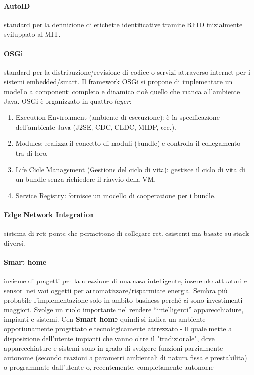 \paragraph*{AutoID} standard per la definizione di etichette identificative
tramite RFID inizialmente sviluppato al MIT.

\paragraph*{OSGi} standard per la distribuzione/revisione di codice o
servizi attraverso internet per i sistemi embedded/smart. Il framework OSGi si 
propone di implementare un modello a componenti completo e dinamico cioè quello 
che manca all'ambiente Java. OSGi è organizzato in quattro \textit{layer}:
\begin{enumerate}
 \item Execution Environment (ambiente di esecuzione): è la specificazione 
dell'ambiente Java (J2SE, CDC, CLDC, MIDP, ecc.).
 \item Modules: realizza il concetto di moduli (bundle) e controlla il 
collegamento tra di loro.
 \item Life Cicle Management (Gestione del ciclo di vita): gestisce il ciclo di 
vita di un bundle senza richiedere il riavvio della VM.
 \item Service Registry: fornisce un modello di cooperazione per i bundle.
\end{enumerate}

\paragraph*{Edge Network Integration} sistema di reti ponte che
permettono di collegare reti esistenti ma basate su stack diversi.

\paragraph*{Smart home} insieme di progetti per la creazione di una casa
intelligente, inserendo attuatori e sensori nei vari oggetti per
automatizzare/risparmiare energia. Sembra più probabile
l'implementazione solo in ambito business perché ci sono investimenti
maggiori. Svolge un ruolo importante nel rendere ``intelligenti'' 
apparecchiature, impianti e sistemi.
Con \textbf{Smart home} quindi si indica un ambiente - opportunamente 
progettato e tecnologicamente attrezzato - il quale mette a disposizione 
dell'utente impianti che vanno oltre il "tradizionale", dove apparecchiature e 
sistemi sono in grado di svolgere funzioni parzialmente autonome (secondo 
reazioni a parametri ambientali di natura fissa e prestabilita) o programmate 
dall'utente o, recentemente, completamente autonome

